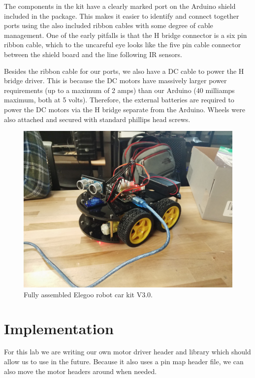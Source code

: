 \documentclass[letterpaper,11pt]{texMemo} %
\begin{document}
The components in the kit have a clearly marked port on the Arduino shield included in 
the package. This makes it easier to identify and connect together ports using the also 
included ribbon cables with some degree of cable management. One of the early pitfalls is
that the H bridge connector is a six pin ribbon cable, which to the uncareful eye looks like 
the five pin cable connector between the shield board and the line following IR sensors.

Besides the ribbon cable for our ports, we also have a DC cable to power the H bridge driver. 
This is because the DC motors have massively larger power requirements (up to a maximum of 2 amps) 
than our Arduino (40 milliamps maximum, both at 5 volts). Therefore, the external batteries are 
required to power the DC motors via the H bridge separate from the Arduino. Wheels were also attached 
and secured with standard phillips head screws.

\begin{figure}[!ht]
\begin{center}
\includegraphics[width=\linewidth]{spare_me.jpg}
\end{center}
\caption{Fully assembled Elegoo robot car kit V3.0.}
\label{fig:f4}
\end{figure}

\section*{Implementation}
For this lab we are writing our own motor driver header and 
library which should allow us to use in the future. Because 
it also uses a pin map header file, we can also move the motor
headers around when needed.
\end{document}
